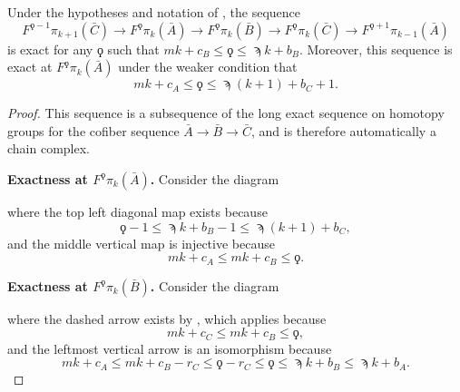 \begin{lem} \label{lemm:qoppa-exactness}
  Under the hypotheses and notation of , the sequence
  $$ F^{\qoppa -1} \pi_{k+1}(\bar{C}) \to F^\qoppa \pi_{k}(\bar{A}) \to F^\qoppa \pi_{k}(\bar{B}) \to F^\qoppa \pi_{k}(\bar{C}) \to F^{\qoppa + 1}\pi_{k-1}(\bar{A}) $$
  is exact for any $\qoppa$ such that $ mk + c_B \leq \qoppa \leq \sampi k + b_B $.
  Moreover, this sequence is exact at $F^\qoppa \pi_k(\bar{A})$ under the weaker condition that
  $$ mk + c_A \leq \qoppa \leq \sampi (k+1) + b_C + 1. $$
\end{lem}

\begin{proof}
  This sequence is a subsequence of the long exact sequence on homotopy groups for the cofiber sequence $\bar{A} \to \bar{B} \to \bar{C}$, and is therefore automatically a chain complex.
    
  {\bf Exactness at $F^{\qoppa} \pi_k (\bar{A})$.} Consider the diagram
  \begin{center}
  \end{center}
  where the top left diagonal map exists because
  $$ \qoppa -1 \leq \sampi k + b_B -1 \leq \sampi (k+1) + b_C, $$
  and the middle vertical map is injective because
  $$ mk + c_A \leq mk + c_B \leq \qoppa. $$
  
  {\bf Exactness at $F^{\qoppa} \pi_k (\bar{B})$.} Consider the diagram
  \begin{center}
  \end{center}
  where the dashed arrow exists by , which applies because
  $$ mk + c_C \leq mk + c_B \leq \qoppa, $$
  and the leftmost vertical arrow is an isomorphism because
  $$ mk + c_A \leq mk + c_B - r_C \leq \qoppa - r_C \leq \qoppa \leq \sampi k + b_B \leq \sampi k + b_A. $$


\end{proof}
